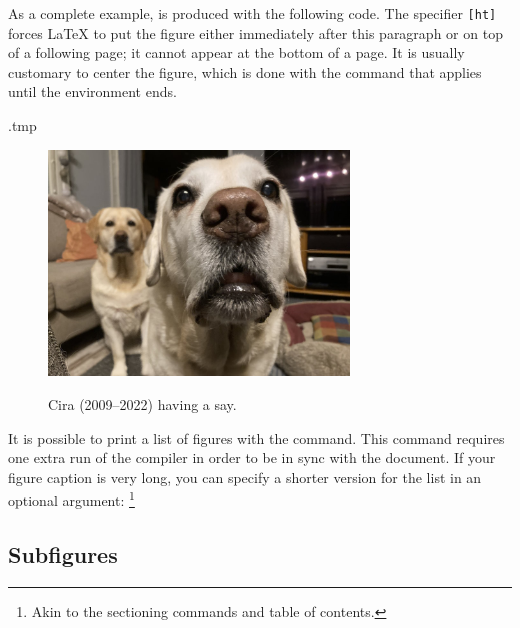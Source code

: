 As a complete example,  is produced with the following code.
The specifier \verb|[ht]| forces \LaTeX{} to put the figure either immediately
after this paragraph or on top of a following page; it cannot appear at the bottom of a page.
It is usually customary to center the figure,
which is done with the  command that applies until the environment ends.%
\label{ex:alt text}
%
\begin{VerbatimOut}{\jobname.tmp}
\begin{figure}[ht]
\centering
\includegraphics[width=8cm,
  alt={An old labrador retriever close up,
    with intense gaze and mouth slightly open.
    In the background, a younger labrador also stares at the camera.}]
  {pictures/TheDogs.jpg}
\caption{Cira (2009--2022) having a say.}
\label{fig:cira}
\end{figure}

\end{VerbatimOut}
\ExecuteExample

It is possible to print a list of figures
with the  command.
This command requires one extra run of the compiler in order to be in sync with the document.
If your figure caption is very long,
you can specify a shorter version for the list in an optional argument:%
\footnote{Akin to the sectioning commands and table of contents.}
\begin{ExampleCode}
\caption[An old labrador]{Cira (2009--2022) having a say.}
\end{ExampleCode}


%
%
\subsection{Subfigures}

